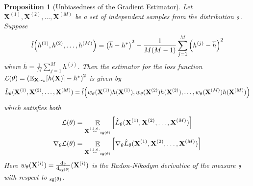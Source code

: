 \documentclass{article}
\theoremstyle{plain}
\newtheorem{proposition}[theorem]{Proposition}
\theoremstyle{definition}
\theoremstyle{remark}
\let\P\relax
\DeclareMathOperator{\P}{\mathbb{P}}
\DeclareMathOperator{\E}{\mathbb{E}}
\DeclareMathOperator{\sg}{\mathrm{sg}}
\DeclareMathOperator{\iid}{\overset{\mathrm{i.i.d.}}{\sim}}
\begin{document}
\begin{proposition}[Unbiasedness of the Gradient Estimator]\label{prop:unbiasedness}
    Let $\mathbf{X}^{(1)}, \mathbf{X}^{(2)}, \dots, \mathbf{X}^{(M)}$ be a set of independent samples from the distribution $\P_\theta$. Suppose
    \begin{equation}
        \hat{l}\qty(h^{(1)}, h^{(2)}, \dots, h^{(M)}) = \qty(\overline{h}-h^*)^2 - \frac{1}{M(M-1)} \sum_{j=1}^{M} \qty(h^{(j)}-\overline{h})^2
    \end{equation}
    where $\overline{h} = \frac{1}{M} \sum_{j=1}^M h^{(j)}$. Then the estimator for the loss function $\mathcal{L}(\theta) = \qty(\mathbb{E}_{\mathbf{X} \sim \P_\theta} \qty[h(\mathbf{X})] - h^*)^2$ is given by
    \begin{equation}
        \hat{L}_\theta(\mathbf{X}^{(1)}, \mathbf{X}^{(2)}, \dots, \mathbf{X}^{(M)}) = \hat{l}\qty(w_\theta(\mathbf{X}^{(1)})h(\mathbf{X}^{(1)}), w_\theta(\mathbf{X}^{(2)})h(\mathbf{X}^{(2)}), \dots, w_\theta(\mathbf{X}^{(M)})h(\mathbf{X}^{(M)}))
    \end{equation}
    which satisfies both
    \begin{align}
        \label{eq:unbias_loss}
        \mathcal{L}(\theta) & = \E_{\mathbf{X} \iid \P_{\sg(\theta)}}\qty[\hat{L}_\theta(\mathbf{X}^{(1)}, \mathbf{X}^{(2)}, \dots, \mathbf{X}^{(M)})] \\ 
        \label{eq:unbias_grad}
        \nabla_\theta\mathcal{L}(\theta) & = \E_{\mathbf{X} \iid \P_{\sg(\theta)}}\qty[\nabla_\theta\hat{L}_\theta(\mathbf{X}^{(1)}, \mathbf{X}^{(2)}, \dots, \mathbf{X}^{(M)})]
    \end{align}
    Here $w_\theta(\mathbf{X}^{(i)}) = \frac{\dd \P_\theta}{\dd \P_{\sg(\theta)}}(\mathbf{X}^{(i)})$ is the Radon-Nikodym derivative of the measure $\P_\theta$ with respect to $\P_{\sg(\theta)}$.
\end{proposition}
\end{document}
